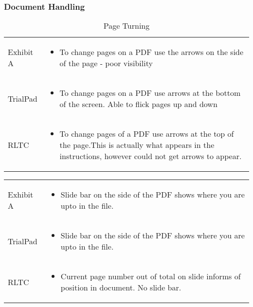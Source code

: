 \subsubsection{Document Handling}
\singlespace
\begin{center}
\begin{table}[h!]
\label{Table 1:}    
\caption{Page Turning}
\centering
\begin{tabular}{|p{2cm}|p{10cm}|}
\hline
\rowcolor{lightgrey}\multicolumn{2}{|c|}{Page Turning}\\
\hline
Exhibit A & \begin{itemize}
    \item To change pages on a PDF use the arrows on the side of the page - poor visibility
\end{itemize}\\
\hline
TrialPad & \begin{itemize}
    \item To change pages on a PDF use arrows at the bottom of the screen. Able to flick pages up and down
\end{itemize}\\
\hline
RLTC & \begin{itemize}
    \item To change pages of a PDF use arrows at the top of the page.This is actually what appears in the instructions, however could not get arrows to appear.
 
\end{itemize}\\
\hline
\end{tabular}
\end{table}
\begin{tabular}{|p{2cm}|p{10cm}|}
\rowcolor{lightgrey}\multicolumn{2}{|c|}{Page Navigation}\\
\hline
Exhibit A & \begin{itemize}
    \item Slide bar on the side of the PDF shows where you are upto in the file.
\end{itemize}\\
\hline
TrialPad & \begin{itemize}
    \item Slide bar on the side of the PDF shows where you are upto in the file.
\end{itemize}\\
\hline
RLTC & \begin{itemize}
    \item Current page number out of total on slide informs of position in document. No slide bar.
\end{itemize}\\
\hline
\end{tabular}
\end{center}
